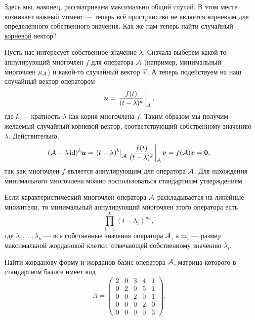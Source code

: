 \medskip
{}
\smallskip

Здесь мы, наконец, рассматриваем максимально общий случай. В этом месте возникает важный момент --- теперь всё пространство не является корневым для определённого собственного значения. Как же нам теперь найти случайный \underline{корневой} вектор?

Пусть нас интересует собственное значение $\lambda$. Сначала выберем какой-то аннулирующий многочлен $f$ для оператора $\mathcal{A}$ (например, минимальный многочлен $\mu_{\mathcal{A}}$) и какой-то случайный вектор $\vec{v}$. А теперь подействуем на наш случайный вектор оператором
\[
	\boldsymbol{u} = \left.\frac{f(t)}{(t - \lambda)^k}\right|_{\mathcal{A}},
\]
где $k$ --- кратность $\lambda$ как корня многочлена $f$. Таким образом мы получим желаемый случайный корневой вектор, соответствующий собственному значению $\lambda$. Действительно,
\[
	(\mathcal{A} - \lambda\operatorname{id})^k\boldsymbol{u} = \left.(t - \lambda)^k\right|_{\mathcal{A}}\left.\frac{f(t)}{(t - \lambda)^k}\right|_{\mathcal{A}}\boldsymbol{v} = f(\mathcal{A})\boldsymbol{v} = \boldsymbol{0},
\]
так как многочлен $f$ является аннулирующим для оператора $\mathcal{A}$. Для нахождения минимального многочлена можно воспользоваться стандартным утверждением.

\begin{proposition}
	Если характеристический многочлен оператора $\mathcal{A}$ раскладывается на линейные множители, то минимальный аннулирующий многочлен этого оператора есть
	\[
		\prod_{i = 1}^k(t - \lambda_i)^{m_i},
	\]
	где $\lambda_1, \ldots, \lambda_k$ --- все собственные значения оператора $\mathcal{A}$, а $m_i$ --- размер максимальной жордановой клетки, отвечающей собственному значению $\lambda_i$.
\end{proposition}

\begin{problem}
	Найти жорданову форму и жорданов базис оператора $\mathcal{A}$, матрица которого в стандартном базисе имеет вид
	\[
		A =
		\begin{pmatrix}
			2 & 0 & 3 & 4 & 1\\
			0 & 2 & 0 & 5 & 1\\
			0 & 0 & 2 & 0 & 1\\
			0 & 0 & 0 & 2 & 0\\
			0 & 0 & 0 & 0 & 3
		\end{pmatrix}.
	\]
\end{problem}

